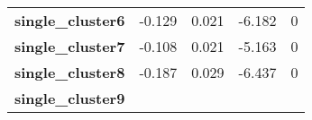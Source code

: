 \documentclass[]{article}
\begin{document}
\begin{longtable}[c]{@{}lllll@{}}
\begin{minipage}[t]{0.31\columnwidth}
\textbf{single\_cluster6}
\strut\end{minipage} &
\begin{minipage}[t]{0.13\columnwidth}\raggedright\strut
-0.129
\strut\end{minipage} &
\begin{minipage}[t]{0.16\columnwidth}\raggedright\strut
0.021
\strut\end{minipage} &
\begin{minipage}[t]{0.12\columnwidth}\raggedright\strut
-6.182
\strut\end{minipage} &
\begin{minipage}[t]{0.12\columnwidth}\raggedright\strut
0
\strut\end{minipage}\tabularnewline
\begin{minipage}[t]{0.31\columnwidth}\raggedright\strut
\textbf{single\_cluster7}
\strut\end{minipage} &
\begin{minipage}[t]{0.13\columnwidth}\raggedright\strut
-0.108
\strut\end{minipage} &
\begin{minipage}[t]{0.16\columnwidth}\raggedright\strut
0.021
\strut\end{minipage} &
\begin{minipage}[t]{0.12\columnwidth}\raggedright\strut
-5.163
\strut\end{minipage} &
\begin{minipage}[t]{0.12\columnwidth}\raggedright\strut
0
\strut\end{minipage}\tabularnewline
\begin{minipage}[t]{0.31\columnwidth}\raggedright\strut
\textbf{single\_cluster8}
\strut\end{minipage} &
\begin{minipage}[t]{0.13\columnwidth}\raggedright\strut
-0.187
\strut\end{minipage} &
\begin{minipage}[t]{0.16\columnwidth}\raggedright\strut
0.029
\strut\end{minipage} &
\begin{minipage}[t]{0.12\columnwidth}\raggedright\strut
-6.437
\strut\end{minipage} &
\begin{minipage}[t]{0.12\columnwidth}\raggedright\strut
0
\strut\end{minipage}\tabularnewline
\begin{minipage}[t]{0.31\columnwidth}\raggedright\strut
\textbf{single\_cluster9}
\strut\end{minipage} &

\end{longtable}
\end{document}
